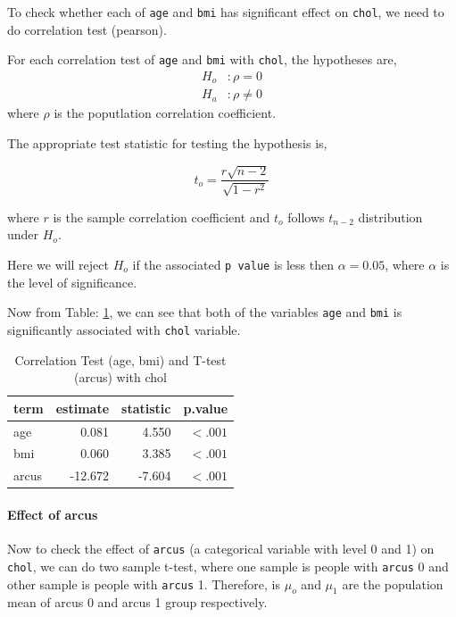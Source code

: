 \documentclass[
  12pt,
  oneside]{article}
\begin{document}
To check whether each of \texttt{age} and \texttt{bmi} has significant effect on \texttt{chol}, we need to do correlation test (pearson).

For each correlation test of \texttt{age} and \texttt{bmi} with \texttt{chol}, the hypotheses are,
\begin{align*}
H_o&: \rho = 0 \\
H_a&: \rho \neq 0
\end{align*}
where \(\rho\) is the poputlation correlation coefficient.

The appropriate test statistic for testing the hypothesis is,

\[
t_o = \frac{r\sqrt{n-2}}{\sqrt{1-r^2}}
\]

where \(r\) is the sample correlation coefficient and \(t_o\) follows \(t_{n-2}\)
distribution under \(H_o\).

Here we will reject \(H_o\) if the associated \texttt{p\ value} is less then \(\alpha = 0.05\), where \(\alpha\) is the level of significance.

Now from Table: \ref{tab:Table-02}, we can see that both of the variables \texttt{age} and \texttt{bmi}
is significantly associated with \texttt{chol} variable.

\begin{table}[H]

\caption{\label{tab:Table-02}Correlation Test (age, bmi) and T-test (arcus) with chol}
\centering
\begin{tabular}[t]{lrrr}
\toprule
term & estimate & statistic & p.value\\
\midrule
age & 0.081 & 4.550 & $<.001$\\
bmi & 0.060 & 3.385 & $<.001$\\
arcus & -12.672 & -7.604 & $<.001$\\
\bottomrule
\end{tabular}
\end{table}

\hypertarget{effect-of-arcus}{%
\paragraph{Effect of arcus}\label{effect-of-arcus}}

Now to check the effect of \texttt{arcus} (a categorical variable with level 0 and 1) on \texttt{chol}, we can do two sample t-test, where one sample is people with \texttt{arcus} 0 and
other sample is people with \texttt{arcus} 1. Therefore, is \(\mu_o\) and \(\mu_1\) are the
population mean of arcus 0 and arcus 1 group respectively.
\end{document}
